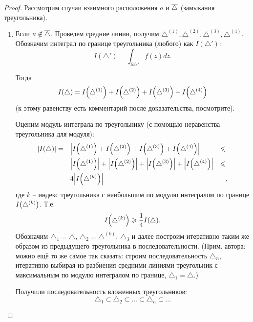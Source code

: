 
\begin{proof}
	Рассмотрим случаи взаимного расположения $a$ и $\overline \triangle$ (замыкания треугольника).
	\begin{enumerate}
		\item Если $a \not\in \overline \triangle$. Проведем средние линии, получим $\triangle^{(1)}, \triangle^{(2)}, \triangle^{(3)}, \triangle^{(4)}$. Обозначим интеграл по границе треугольника (любого) как $I(\triangle')$:
		\[
			I(\triangle') = \int_{\partial \triangle'} f(z) dz.
		\]
		
		Тогда \begin{align}
			\label{gurse_middle_lines}
			I(\triangle) = I\mathopen{}\left( \triangle^{(1)} \right)\mathclose{} + I\mathopen{}\left( \triangle^{(2)} \right)\mathclose{} + I\mathopen{}\left( \triangle^{(3)} \right)\mathclose{} + I\mathopen{}\left( \triangle^{(4)} \right)\mathclose{}
		\end{align}
		(к этому равенству есть комментарий после доказательства, посмотрите).

		Оценим модуль интеграла по треугольнику (с помощью неравенства треугольника для модуля):
		\[
			\begin{aligned}
				\mathopen{}\left\lvert I(\triangle)\right\rvert\mathclose{} & = && \mathopen{}\left\lvert I\mathopen{}\left( \triangle^{(1)} \right)\mathclose{} + I\mathopen{}\left( \triangle^{(2)} \right)\mathclose{} + I\mathopen{}\left( \triangle^{(3)} \right)\mathclose{} + I\mathopen{}\left( \triangle^{(4)} \right)\mathclose{}\right\rvert\mathclose{} & \leqslant & \\
				& && \mathopen{}\left\lvert I\mathopen{}\left( \triangle^{(1)} \right)\mathclose{}\right\rvert\mathclose{} + \mathopen{}\left\lvert I\mathopen{}\left( \triangle^{(2)} \right)\mathclose{}\right\rvert\mathclose{} + \mathopen{}\left\lvert I\mathopen{}\left( \triangle^{(3)} \right)\mathclose{}\right\rvert\mathclose{} + \mathopen{}\left\lvert I\mathopen{}\left( \triangle^{(4)} \right)\mathclose{}\right\rvert\mathclose{} & \leqslant & \\
				& && 4 \mathopen{}\left\lvert I\mathopen{}\left( \triangle^{(k)} \right)\mathclose{}\right\rvert\mathclose{} && ,
			\end{aligned}
		\]
		где $k$ -- индекс треугольника с наибольшим по модулю интегралом по границе $I\mathopen{}\left( \triangle^{(k)} \right)\mathclose{}$. Т.е.
		\[
			I \mathopen{}\left( \triangle^{(k)} \right)\mathclose{} \geqslant \frac{1}{4} I(\triangle).
		\]
		Обозначим $\triangle_1 = \triangle$, $\triangle_2 = \triangle^{(k)}$, $\triangle_3$ и далее построим итеративно таким же образом из предыдущего треугольника в последовательности. (Прим. автора: можно ещё то же самое так сказать: строим последовательность $\triangle_n$, итеративно выбирая из разбиения средними линиями треугольник с максимальным по модулю интегралом по границе, $\triangle_1 = \triangle$.)
		
		Получили последовательность вложенных треугольников:
		\[
			\triangle_1 \subset \triangle_2 \subset \ldots \subset \triangle_n \subset \ldots
		\]
		

\end{enumerate}
\end{proof}
